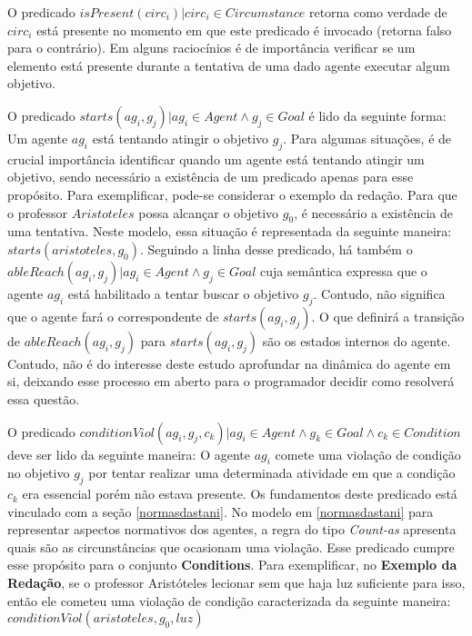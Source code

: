 O predicado $isPresent(circ_i) | circ_i \in Circumstance $ retorna como verdade de $circ_i$ está presente no momento em que este predicado é invocado (retorna falso para o contrário). Em alguns raciocínios é de importância verificar se um elemento está presente durante a tentativa de uma dado agente executar algum objetivo.

O predicado $starts(ag_i,g_j) | ag_i \in Agent \wedge g_j \in Goal $ é lido da seguinte forma: Um agente $ag_i$ está tentando atingir o objetivo $g_j$. Para algumas situações, é de crucial importância identificar quando um agente está tentando atingir um objetivo, sendo necessário a existência de um predicado apenas para esse propósito. Para exemplificar, pode-se considerar o exemplo da redação. Para que o professor $Aristoteles$ possa alcançar o objetivo $g_0$, é necessário a existência de uma tentativa. Neste modelo, essa situação é representada da seguinte maneira: $starts(aristoteles,g_0)$. Seguindo a linha desse predicado, há também o $ableReach(ag_i,g_j) | ag_i \in Agent \wedge g_j \in Goal$ cuja semântica expressa que o agente $ag_i$ está habilitado a tentar buscar o objetivo $g_j$. Contudo, não significa que o agente fará o correspondente de $starts(ag_i,g_j)$. O que definirá a transição de $ableReach(ag_i,g_j)$ para $starts(ag_i,g_j)$ são os estados internos do agente. Contudo, não é do interesse deste estudo aprofundar na dinâmica do agente em si, deixando esse processo em aberto para o programador decidir como resolverá essa questão.

O predicado $ conditionViol(ag_i,g_j,c_k) | ag_i \in Agent \wedge g_k \in Goal \wedge c_k \in Condition$ deve ser lido da seguinte maneira: O agente $ag_i$ comete uma violação de condição no objetivo $g_j$ por tentar realizar uma determinada atividade em que a condição $c_k$ era essencial porém não estava presente. Os fundamentos deste predicado está vinculado com a seção \ref{normasdastani}. No modelo em \ref{normasdastani} para representar aspectos normativos dos agentes, a regra do tipo \textit{Count-as} apresenta quais são as circunstâncias que ocasionam uma violação. Esse predicado cumpre esse propósito para o conjunto \textbf{Conditions}. Para exemplificar, no \textbf{Exemplo da Redação}, se o professor Aristóteles lecionar sem que haja luz suficiente para isso, então ele cometeu uma violação de condição caracterizada da seguinte maneira: $conditionViol(aristoteles,g_0,luz)$

